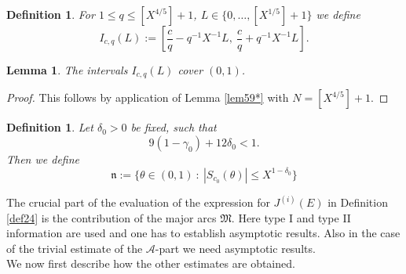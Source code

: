 \documentclass{amsart}
\newtheorem{lemma}[theorem]{Lemma}
\numberwithin{equation}{subsection}
\newtheorem{definition}[theorem]{Definition}
\begin{document}
\begin{definition}\label{def510*}
For $1\leq q\leq [X^{4/5}]+1$, $L\in \{0,\ldots, [X^{1/5}]+1\}$ we define
$$I_{c,q}(L):=\left[\frac{c}{q}-q^{-1}X^{-1}L,\ \frac{c}{q}+q^{-1}X^{-1}L  \right].$$
\end{definition}

\begin{lemma}\label{lem511*}
The intervals $I_{c,q}(L)$ cover $(0,1)$.
\end{lemma}
\begin{proof}
This follows by application of Lemma \ref{lem59*} with $N=[X^{4/5}]+1$.
\end{proof}

\begin{definition}\label{def512}
Let $\delta_0>0$ be fixed, such that
$$9(1-\gamma_0)+12\delta_0<1.$$
Then we define
$$\mathfrak{n}:=\{ \theta\in(0,1)\::\: |S_{c_0}(\theta)|\leq X^{1-\delta_0} \}$$
\end{definition}

The crucial part of the evaluation of the expression for $J^{(i)}(E)$ in Definition \ref{def24} is the contribution of the major arcs $\mathfrak{M}$. Here type I and type II information are used and one has to establish asymptotic results. Also in the case of the trivial estimate of the $\mathcal{A}$-part we need asymptotic results.\\
We now first describe how the other estimates are obtained.
\end{document}
